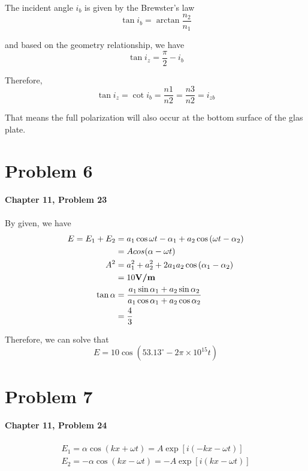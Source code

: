 \documentclass{article}
\begin{document}
The incident angle $i_b$ is given by the Brewster's law
\begin{equation*}
    \tan{i_b} = \arctan{\frac{n_2}{n_1}}
\end{equation*}

and based on the geometry relationship, we have
\begin{equation*}
    \tan{i_z}  = \frac{\pi}{2} - i_b
\end{equation*}

Therefore,
\begin{equation*}
    \tan{i_z} =\operatorname{cot}i_b = \frac{n1}{n2} = \frac{n3}{n2} = i_{zb}
\end{equation*}

That means the full polarization will also occur at the bottom surface of the glas plate.

\section{Problem 6}
\textbf{Chapter 11, Problem 23}\\\\

By given, we have
\begin{align*}
    E  = E_1+E_2 & = a_1\cos{\omega t-\alpha_1}+a_2\cos{(\omega t-\alpha_2)}                        \\
                 & = Acos(\alpha - \omega t)                                                        \\
    A^2          & = a_1^2+a_2^2+2a_1a_2\cos{(\alpha_1-\alpha_2)}                                   \\
                 & = 10 \textbf{V\slash m}                                                          \\
    \tan{\alpha} & =\frac{a_1\sin{\alpha_1}+a_2\sin{\alpha_2}}{a_1\cos{\alpha_1}+a_2\cos{\alpha_2}} \\
                 & = \frac{4}{3}
\end{align*}

Therefore, we can solve that
\begin{equation*}
    E = 10\cos(53.13^\circ - 2\pi\times10^{15}t)
\end{equation*}

\section{Problem 7}
\textbf{Chapter 11, Problem 24}\\\\
\begin{align*}
    E_1 = \alpha\cos{\left(kx+\omega t\right)} = A\exp{\left[i(-kx-\omega t)\right]} \\
    E_2 = -\alpha\cos{\left(kx-\omega t\right)} = -A\exp{\left[i(kx-\omega t)\right]}
\end{align*}
\end{document}
